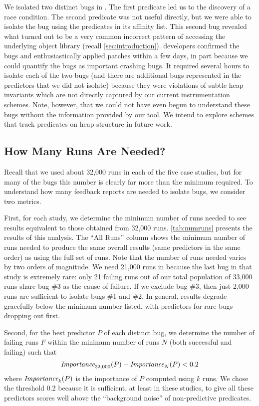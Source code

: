 We isolated two distinct bugs in \rhythmbox.  The first predicate led
us to the discovery of a race condition.  The second predicate was not
useful directly, but we were able to isolate the bug using the
predicates in its affinity list.  This second bug revealed what turned
out to be a very common incorrect pattern of accessing the underlying
object library (recall \autoref{sec:introduction}).  \rhythmbox
developers confirmed the bugs and enthusiastically applied patches
within a few days, in part because we could quantify the bugs as
important crashing bugs.  It required several hours to isolate each of
the two bugs (and there are additional bugs represented in the
predictors that we did not isolate) because they were violations of subtle heap
invariants which are not directly captured by our current
instrumentation schemes.  Note, however, that we could not have even
begun to understand these bugs without the information provided by our
tool.  We intend to explore schemes that track predicates on heap
structure in future work.

\subsection{How Many Runs Are Needed?}
\label{sec:numruns}



Recall that we used about 32,000 runs in each of the five case studies, but
for many of the bugs this number is clearly far more than the minimum
required. To understand how many feedback reports are needed to isolate
bugs, we consider two metrics.

First, for each study, we determine the minimum number of runs needed
to see results equivalent to those obtained from 32,000 runs.
\autoref{tab:numruns} presents the results of this analysis.  The
``All Runs'' column shows the minimum number of runs needed to
produce the same overall results (same predictors in the same order)
as using the full set of runs.  Note that the number of runs needed
varies by two orders of magnitude.  We need 21,000 runs in \exif{}
because the last bug in that study is extremely rare: only 21 failing
runs out of our total population of 33,000 runs share bug \#3 as the
cause of failure.  If we exclude bug \#3, then just 2,000 runs are
sufficient to isolate \exif{} bugs \#1 and \#2.  In general, results
degrade gracefully below the minimum number listed, with predictors
for rare bugs dropping out first.

Second, for the best predictor $P$ of each distinct bug, we determine
the number of failing runs $F$ within the minimum number of runs $N$
(both successful and failing) such that
\[ \textit{Importance}_{32,000}(P) - \textit{Importance}_N(P) < 0.2 \]
where $\textit{Importance}_k(P)$ is the importance of $P$ computed using $k$
runs.  We chose the threshold 0.2 because it is sufficient, at least
in these studies, to give all these predictors scores well above the
``background noise'' of non-predictive predicates.

